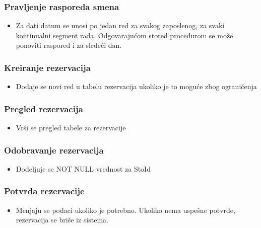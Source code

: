 \documentclass{article}
\begin{document}
\subsubsection{Pravljenje rasporeda smena}
\begin{itemize}
\item Za dati datum se unosi po jedan red za svakog zaposlenog, za svaki kontinualni segment rada. Odgovarajućom stored procedurom se može ponoviti raspored i za sledeći dan.
\end{itemize}


\subsubsection{Kreiranje rezervacija}
\begin{itemize}
\item  Dodaje se novi red u tabelu rezervacija ukoliko je to moguće zbog ograničenja 
\end{itemize}


\subsubsection{Pregled rezervacija}
\begin{itemize}
\item Vrši se pregled tabele za rezervacije 
\end{itemize}


\subsubsection{Odobravanje rezervacija}
\begin{itemize}
\item Dodeljuje se NOT NULL vrednost za StoId 
\end{itemize}

\subsubsection{Potvrda rezervacije}
\begin{itemize}
\item Menjaju se podaci ukoliko je potrebno. Ukoliko nema uspešne potvrde, rezervacija se briše iz sistema.
\end{itemize}

\end{document}
